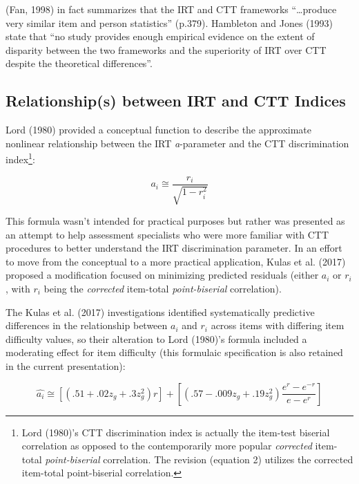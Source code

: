 \documentclass[
  jou]{apa6}
\begin{document}
(Fan, 1998) in fact summarizes that the IRT and CTT frameworks ``\ldots produce very similar item and person statistics'' (p.379). Hambleton and Jones (1993) state that ``no study provides enough empirical evidence on the extent of disparity between the two frameworks and the superiority of IRT over CTT despite the theoretical differences''.

\hypertarget{relationships-between-irt-and-ctt-indices}{%
\subsection{Relationship(s) between IRT and CTT Indices}\label{relationships-between-irt-and-ctt-indices}}

Lord (1980) provided a conceptual function to describe the approximate nonlinear relationship between the IRT \emph{a}-parameter and the CTT discrimination index\footnote{Lord (1980)'s CTT discrimination index is actually the item-test biserial correlation as opposed to the contemporarily more popular \emph{corrected} item-total \emph{point-biserial} correlation. The revision (equation 2) utilizes the corrected item-total point-biserial correlation.}:

\begin{equation}
a_i\cong \frac{r_i}{\sqrt{1-r_i^2}}
\end{equation}

This formula wasn't intended for practical purposes but rather was presented as an attempt to help assessment specialists who were more familiar with CTT procedures to better understand the IRT discrimination parameter. In an effort to move from the conceptual to a more practical application, Kulas et al. (2017) proposed a modification focused on minimizing predicted residuals (either \(a_i\) or \(r_i\), with \(r_i\) being the \emph{corrected} item-total \emph{point-biserial} correlation).

The Kulas et al. (2017) investigations identified systematically predictive differences in the relationship between \(a_i\) and \(r_i\) across items with differing item difficulty values, so their alteration to Lord (1980)'s formula included a moderating effect for item difficulty (this formulaic specification is also retained in the current presentation):

\begin{equation}
\hat{a_i}\cong[(.51 + .02z_g + .3z_g^2)r]+[(.57 - .009z_g + .19z_g^2)\frac{e^r-e^{-r}}{e-e^r}]
\end{equation}
\end{document}

